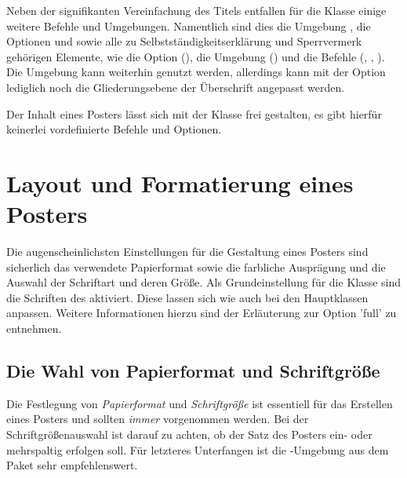 \begin{Bundle*}[v2.05]{}
Neben der signifikanten Vereinfachung des Titels entfallen für die Klasse 
 einige weitere Befehle und Umgebungen. Namentlich sind 
dies die Umgebung , die Optionen  
und  sowie alle zu Selbstständigkeitserklärung und 
Sperrvermerk gehörigen Elemente, wie die Option (), die 
Umgebung () und die Befehle (, 
, ). Die Umgebung  
kann weiterhin genutzt werden, allerdings kann mit der Option  
lediglich noch die Gliederungsebene der Überschrift angepasst werden.

Der Inhalt eines Posters lässt sich mit der Klasse  frei 
gestalten, es gibt hierfür keinerlei vordefinierte Befehle und Optionen. 
\section{Layout und Formatierung eines Posters}
%
Die augenscheinlichsten Einstellungen für die Gestaltung eines Posters sind 
sicherlich das verwendete Papierformat sowie die farbliche Ausprägung und die 
Auswahl der Schriftart und deren Größe. Als Grundeinstellung für die Klasse
 sind die Schriften des \TUDCDs aktiviert. Diese lassen 
sich wie auch bei den Hauptklassen anpassen. Weitere Informationen hierzu sind 
der Erläuterung zur Option 'full' zu entnehmen. 


\subsection{Die Wahl von Papierformat und Schriftgröße}
%
%
%

Die Festlegung von \emph{Papierformat} und \emph{Schriftgröße} ist essentiell 
für das Erstellen eines Posters und sollten \emph{immer} vorgenommen werden. 
Bei der Schriftgrößenauswahl ist darauf zu achten, ob der Satz des Posters 
ein- oder mehrspaltig erfolgen soll. Für letzteres Unterfangen ist die 
-Umgebung aus dem Paket  sehr 
empfehlenswert. 


\end{Bundle*}
